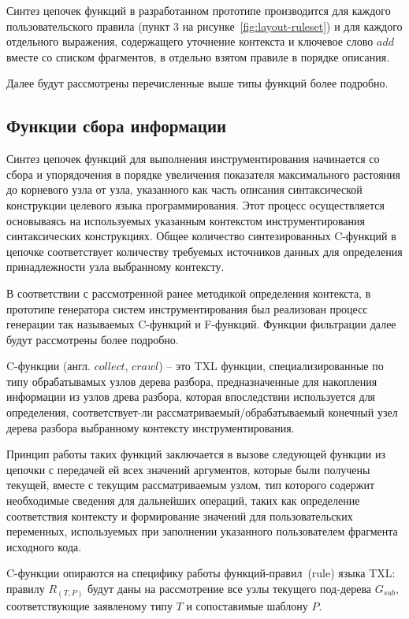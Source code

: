 Синтез цепочек функций в разработанном прототипе производится для каждого пользовательского правила (пункт 3 на рисунке~\ref{fig:layout-ruleset}) и для каждого отдельного выражения, содержащего уточнение контекста и ключевое слово $add$ вместе со списком фрагментов, в отдельно взятом правиле в порядке описания.

Далее будут рассмотрены перечисленные выше типы функций более подробно.

\subsection{Функции сбора информации}

Синтез цепочек функций для выполнения инструментирования начинается со сбора и упорядочения в порядке увеличения показателя максимального растояния до корневого узла от узла, указанного как часть описания синтаксической конструкции целевого языка программирования.
Этот процесс осуществляется основываясь на используемых указанным контекстом инструментирования синтаксических конструкциях.
Общее количество синтезированных C-функций в цепочке соответствует количеству требуемых источников данных для определения принадлежности узла выбранному контексту.

В соответствии с рассмотренной ранее методикой определения контекста, в прототипе генератора систем инструментирования был реализован процесс генерации так называемых C-функций и F-функций.
Функции фильтрации далее будут рассмотрены более подробно.

C-функции (англ. $collect$, $crawl$) -- это TXL функции, специализированные по типу обрабатывамых узлов дерева разбора, предназначенные для накопления информации из узлов древа разбора, которая впоследствии используется для определения, соответствует-ли рассматриваемый/обрабатываемый конечный узел дерева разбора выбранному контексту инструментирования.

Принцип работы таких функций заключается в вызове следующей функции из цепочки с передачей ей всех значений аргументов, которые были получены текущей, вместе с текущим рассматриваемым узлом, тип которого содержит необходимые сведения для дальнейших операций, таких как определение соответствия контексту и формирование значений для пользовательских переменных, используемых при заполнении указанного пользователем фрагмента исходного кода.

C-функции опираются на специфику работы функций-правил~(rule) языка TXL: правилу $R_{(T,P)}$ будут даны на рассмотрение все узлы текущего под-дерева $G_{sub}$, соответствующие заявленому типу $T$ и сопоставимые шаблону $P$.

